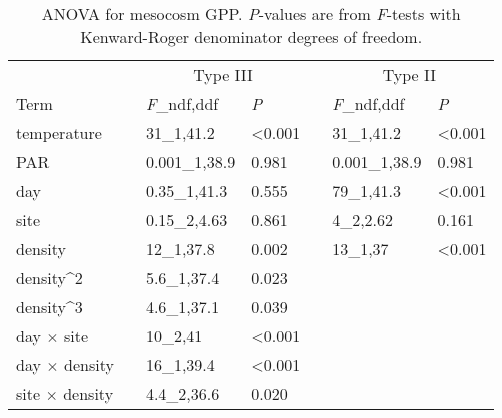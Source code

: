 \documentclass[12pt]{article}
\begin{document}

\clearpage



\clearpage







\begin{table}
\caption{\label{tab:gpp}
ANOVA for mesocosm GPP. \emph{P}-values are from \emph{F}-tests with
Kenward-Roger denominator degrees of freedom.}
\setlength{\tabcolsep}{12pt}
\begin{tabular}{lllllll}
\toprule
& & \multicolumn{2}{c}{Type III} & & \multicolumn{2}{c}{Type II} \\
\cmidrule{3-4} \cmidrule{6-7}
Term & & \emph{F}_{ndf,ddf} & \emph{P} & & \emph{F}_{ndf,ddf} & \emph{P}\\
\midrule
temperature & & 31_{1,41.2} & <0.001 & & 31_{1,41.2} & <0.001\\

PAR & & 0.001_{1,38.9} & 0.981 & & 0.001_{1,38.9} & 0.981\\

day & & 0.35_{1,41.3} & 0.555 & & 79_{1,41.3} & <0.001\\

site & & 0.15_{2,4.63} & 0.861 & & 4_{2,2.62} & 0.161\\

density & & 12_{1,37.8} & 0.002 & & 13_{1,37} & <0.001\\

density^2 & & 5.6_{1,37.4} & 0.023 & &  & \\

density^3  & & 4.6_{1,37.1} & 0.039 & & & \\

day $\times$ site & & 10_{2,41} & <0.001 & & & \\

day $\times$ density & & 16_{1,39.4} & <0.001 & & & \\

site $\times$ density & & 4.4_{2,36.6} & 0.020 & & & \\
\bottomrule
\end{tabular}
\end{table}
\end{document}
